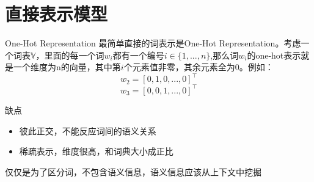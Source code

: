 \documentclass[10pt,aspectratio=43,table,fontset=none]{beamer}
\begin{document}
\section{直接表示模型}
\begin{frame}{One-Hot Representation}
最简单直接的词表示是One-Hot Representation。考虑一个词表$ \mathbb V $，里面的每一个词$ w_i $都有一个编号$ i\in \{1,...,n\} $,那么词$ w_i $的one-hot表示就是一个维度为n的向量，其中第$ i $个元素值非零，其余元素全为0。例如：
\[  w_2=[0,1,0,...,0]^\top  \]
\[  w_3=[0,0,1,...,0]^\top  \]
\begin{block}{缺点}
	\begin{itemize}
		\item<0-> 彼此正交，不能反应词间的语义关系
		\item<0-> 稀疏表示，维度很高，和词典大小成正比
	\end{itemize}
\end{block}
\begin{center}
	\textcolor{mymauve}{仅仅是为了区分词，不包含语义信息，语义信息应该从上下文中挖掘}
\end{center}
\end{frame}
\end{document}
